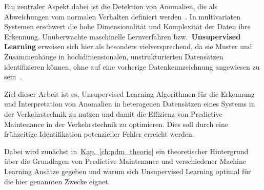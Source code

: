 Ein zentraler Aspekt dabei ist die Detektion von Anomalien, die als Abweichungen vom normalen Verhalten definiert
werden~\cite{Chandola2009}. In multivariaten Systemen erschwert die hohe Dimensionalität und Komplexität der Daten ihre Erkennung.
Unüberwachte maschinelle Lernverfahren bzw.~\textbf{Unsupervised Learning} erweisen sich hier als besonders vielversprechend,
da sie Muster und Zusammenhänge in hochdimensionalen, unstrukturierten Datensätzen identifizieren können, ohne auf eine vorherige
Datenkennzeichnung angewiesen zu sein~\cite{Chandola2009, Wenig2024}.

Ziel dieser Arbeit ist es, Unsupervised Learning Algorithmen für die Erkennung und Interpretation von Anomalien in
heterogenen Datensätzen eines Systems in der Verkehrstechnik zu nutzen und damit die Effizienz von Predictive Maintenance
in der Verkehrstechnik zu optimieren. Dies soll durch eine frühzeitige Identifikation potenzieller Fehler erreicht werden.

Dabei wird zunächst in~\hyperref[ch:pdm_theorie]{Kap.~\ref*{ch:pdm_theorie}} ein theoretischer Hintergrund über die Grundlagen
von Predictive Maintenance und verschiedener Machine Learning Ansätze gegeben und warum sich Unsupervised Learning optimal für
die hier genannten Zwecke eignet.
